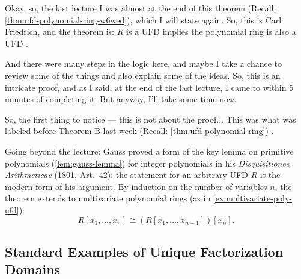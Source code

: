 \begin{speech}[00:00:00 - 00:00:47]
Okay, so, the last lecture I was almost at the end of this theorem (Recall: \cref{thm:ufd-polynomial-ring-w6wed}), which I will state again. So, this is Carl Friedrich, and the theorem is: $R$ is a UFD implies the polynomial ring is also a UFD .

And there were many steps in the logic here, and maybe I take a chance to review some of the things and also explain some of the ideas. So, this is an intricate proof, and as I said, at the end of the last lecture, I came to within $5$ minutes of completing it. But anyway, I'll take some time now.

So, the first thing to notice --- this is not about the proof... This was what was labeled before Theorem B last week (Recall: \cref{thm:ufd-polynomial-ring}) .
\end{speech}

\begin{content}


\begin{steps}
Going beyond the lecture: Gauss proved a form of the key lemma on primitive polynomials (\cref{lem:gauss-lemma}) for integer polynomials in his \emph{Disquisitiones Arithmeticae} (1801, Art.~42); the statement for an arbitrary UFD $R$ is the modern form of his argument. By induction on the number of variables $n$, the theorem extends to multivariate polynomial rings (as in \cref{ex:multivariate-poly-ufd}):
\[
R[x_1, \dots, x_n] \cong (R[x_1, \dots, x_{n-1}])[x_n].
\]
\end{steps}
\end{content}

\subsection{Standard Examples of Unique Factorization Domains}

